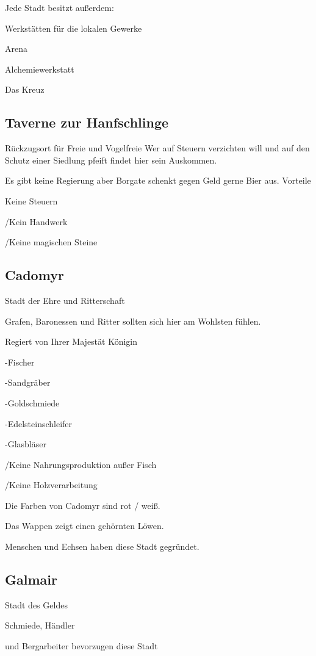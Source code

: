 \documentclass[a4paper,11pt]{book}
\begin{document}
Jede Stadt besitzt außerdem:

Werkstätten für die lokalen Gewerke

Arena

Alchemiewerkstatt



Das Kreuz

\subsection{Taverne zur Hanfschlinge}

Rückzugsort für Freie und Vogelfreie Wer auf Steuern verzichten will und auf den Schutz einer Siedlung pfeift findet hier sein Auskommen.

Es gibt keine Regierung aber Borgate schenkt gegen Geld gerne Bier aus. Vorteile

Keine Steuern

/Kein Handwerk

/Keine magischen Steine


\subsection{Cadomyr}

Stadt der Ehre und Ritterschaft

Grafen, Baronessen und Ritter sollten sich hier am Wohlsten fühlen.

Regiert von Ihrer Majestät Königin

-Fischer

-Sandgräber

-Goldschmiede

-Edelsteinschleifer

-Glasbläser

/Keine Nahrungsproduktion außer Fisch

/Keine Holzverarbeitung

Die Farben von Cadomyr sind rot / weiß.

Das Wappen zeigt einen gehörnten Löwen.

Menschen und Echsen haben diese Stadt gegründet.

\subsection{Galmair}

Stadt des Geldes

Schmiede, Händler

und Bergarbeiter bevorzugen diese Stadt
\end{document}
